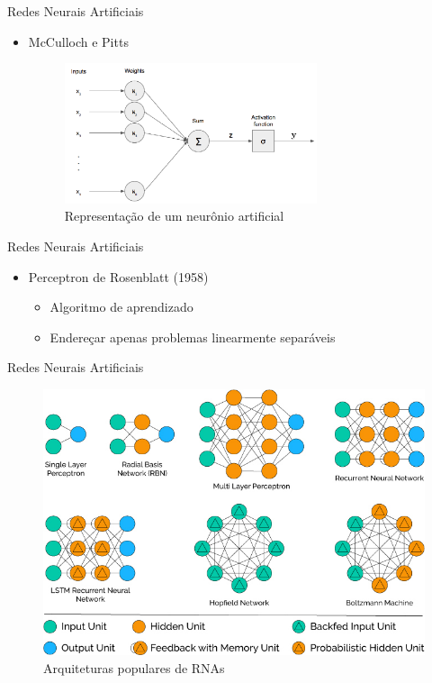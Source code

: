 \begin{frame}{Redes Neurais Artificiais}
   \ \  \\[0.1cm]
  \begin{itemize}
  \item McCulloch e Pitts
  \begin{figure}[ht]
  	\centering
  	\label{fig:neuronio}
  	\includegraphics[width=0.7\textwidth]{img/perceptron.png}
     \caption{Representação de um neurônio artificial}
  \end{figure}
\end{itemize}
\end{frame}

\begin{frame}{Redes Neurais Artificiais}
   \ \  \\[0.1cm]
  \begin{itemize}
  \item Perceptron de Rosenblatt (1958)
  \begin{itemize}
    \item Algoritmo de aprendizado
    \item Endereçar apenas problemas linearmente separáveis
  \end{itemize}
\end{itemize}
\end{frame}

\begin{frame}{Redes Neurais Artificiais}
   \ \  \\[0.1cm]
   \begin{figure}[!h]
   	\label{fig:popular_archs}
   	\includegraphics[width=0.6\linewidth]{img/popular_archs}
     \caption{Arquiteturas populares de RNAs}
   \end{figure}
\end{frame}

